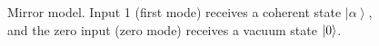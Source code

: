 \begin{figure}
\centering



\caption{Mirror model. Input 1 (first mode) receives 
a coherent state $\left|\alpha\right>$, and the zero input
(zero mode) receives a vacuum state $\ket{0}$.}
\label{figPart2Interfero_3}
\end{figure}